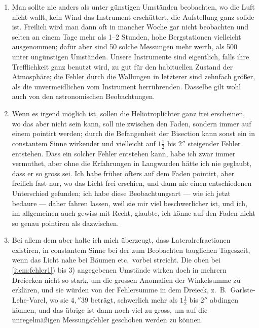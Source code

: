 \documentclass[12pt,a4paper]{article}
\theoremstyle{plain}
\theoremstyle{definition}
\theoremstyle{remark}
\begin{document}
\begin{enumerate}[label=\arabic*)]
\item Man sollte nie anders als unter g\"unstigen Umst\"anden beobachten, wo die Luft nicht wallt, kein Wind das Instrument ersch\"uttert, die Aufstellung ganz solide ist. Freilich wird man dann oft in mancher Woche gar nicht beobachten und selten an einem Tage mehr als 1--2 Stunden, hohe Bergstationen vielleicht ausgenommen; daf\"ur aber sind 50 solche Messungen mehr werth, als 500 unter ung\"unstigen Umst\"anden. Unsere Instrumente sind eigentlich, falls ihre Trefflichkeit ganz benutzt wird, zu gut f\"ur den habituellen Zustand der Atmosph\"are; die Fehler durch die Wallungen in letzterer sind zehnfach gr\"o\ss er, als die unvermeidlichen vom Instrument herr\"uhrenden. Dasselbe gilt wohl auch von den astronomischen Beobachtungen.

\item Wenn es irgend m\"oglich ist, sollen die Heliotroplichter ganz frei erscheinen, wo das aber nicht sein kann, soll nie zwischen den Faden, sondern immer auf einem pointirt werden; durch die Befangenheit der Bisection kann sonst ein in constantem Sinne wirkender und vielleicht auf $1\tfrac12$ bis $2''$ steigender Fehler entstehen. Dass ein solcher Fehler entstehen kann, habe ich zwar immer vermuthet, aber ohne die Erfahrungen in Langwarden h\"atte ich nie geglaubt, dass er so gross sei. Ich habe fr\"uher \"ofters auf dem Faden pointirt, aber freilich fast nur, wo das Licht frei erschien, und dann nie einen entschiedenen Unterschied gefunden; ich habe diese Beobachtungsart --- wie ich jetzt bedaure --- daher fahren lassen, weil sie mir viel beschwerlicher ist, und ich, im allgemeinen auch gewiss mit Recht, glaubte, ich k\"onne auf den Faden nicht so genau pointiren als dazwischen.

\item Bei allem dem aber halte ich mich \"uberzeugt, dass Lateralrefractionen existiren, in constantem Sinne bei der zum Beobachten tauglichen Tageszeit, wenn das Licht nahe bei B\"aumen etc.\ vorbei streicht. Die oben bei \ref{item:fehler1}) bis 3) angegebenen Umst\"ande wirken doch in mehrern Dreiecken nicht so stark, um die grossen Anomalien der Winkelsumme zu erkl\"aren, und sie w\"urden von der Fehlersumme in dem Dreieck, z.~B.\ Garlste-Lehe-Varel, wo sie $4{,}\!''\!39$ betr\"agt, schwerlich mehr als $1\tfrac12$ bis $2''$ abdingen k\"onnen, und das \"ubrige ist dann noch viel zu gross, um auf die unregelm\"a\ss igen Messungsfehler geschoben werden zu k\"onnen.
\end{enumerate}
\end{document}
